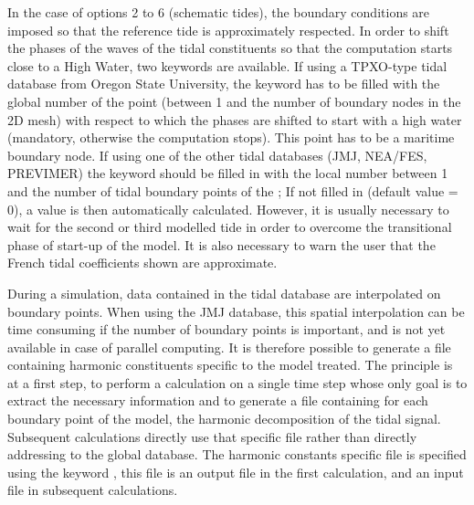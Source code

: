 In the case of options 2 to 6 (schematic tides), the boundary conditions are
imposed so that the reference tide is approximately respected.
In order to shift the phases of the waves of the tidal constituents so that
the computation starts close to a High Water, two keywords are available.
If using a TPXO-type tidal database from Oregon State University, the keyword
 has to be filled
with the global number of the point (between 1 and the number of boundary
nodes in the 2D mesh) with respect to which the phases are shifted
to start with a high water (mandatory, otherwise the computation stops).
This point has to be a maritime boundary node.
If using one of the other tidal databases (JMJ, NEA/FES, PREVIMER) the keyword
 should be filled in
with the local number between 1 and the number of tidal boundary points of the
; If not filled in (default value = 0), a value
is then automatically calculated.
However, it is usually necessary to wait for the second or third modelled tide
in order to overcome the transitional phase of start-up of the model.
It is also necessary to warn the user that the French tidal coefficients shown
are approximate.

During a simulation, data contained in the tidal database are interpolated
on boundary points.
When using the JMJ database, this spatial interpolation can be time consuming
if the number of boundary points is important, and is not yet available in case
of parallel computing.
It is therefore possible to generate a file containing harmonic constituents
specific to the model treated.
The principle is at a first step, to perform a calculation on a single time step
whose only goal is to extract the necessary information and to generate a file
containing for each boundary point of the model, the harmonic decomposition of
the tidal signal.
Subsequent calculations directly use that specific file rather than directly
addressing to the global database.
The harmonic constants specific file is specified using the keyword
, this file is an output file in the first
calculation, and an input file in subsequent calculations.
\\

